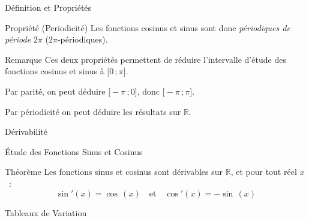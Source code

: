 \documentclass{cours}
\begin{document}
\begin{Gpartie}{Définition et Propriétés}
\begin{Spartie}{Propriété (Periodicité)}
            Les fonctions cosinus et sinus sont donc \emph{périodiques de période} $2\pi$ ($2\pi$-périodiques).
        \end{Spartie}
        \begin{Spartie}{Remarque} 
            Ces deux propriétés permettent de réduire l'intervalle d'étude des fonctions cosinus et sinus à $\big[0\,; \pi\big]$.

            Par parité, on peut déduire $\big[-\pi\,; 0\big]$, donc $\big[-\pi\,; \pi\big]$.
            
            Par périodicité on peut déduire les résultats sur $\mathbb{R}$.
        \end{Spartie}
    \end{Gpartie}
    \begin{Gpartie}{Dérivabilité} 
        \begin{Spartie}{Étude des Fonctions Sinus et Cosinus} 
            \begin{SSpartie}{Théorème} 
                Les fonctions sinus et cosinus sont dérivables sur $\mathbb{R}$, et pour tout réel $x$~: \[\boxed{\sin'(x)=\cos\,(x)}\quad\text{et}\quad\boxed{\cos'(x)=-\sin\,(x)}\]
            \end{SSpartie}
            \begin{SSpartie}{Tableaux de Variation} 
                \begin{center}
                    \parbox{\linewidth}{}
                \end{center}
            \end{SSpartie}
            \pagebreak

\end{Spartie}
\end{Gpartie}
\end{document}
